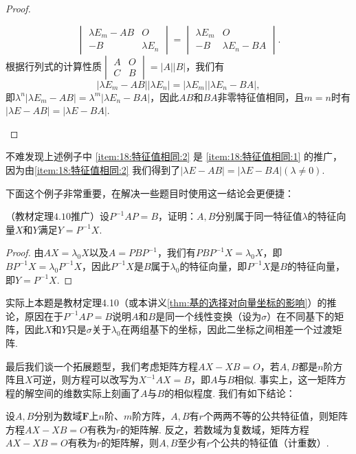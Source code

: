 \begin{proof}
\begin{enumerate}
\[\begin{vmatrix}
                      \lambda E_m-AB & O \\ -B & \lambda E_n
                  \end{vmatrix}=\begin{vmatrix}
                      \lambda E_m & O \\ -B & \lambda E_n-BA
                  \end{vmatrix}.\]
              根据行列式的计算性质$\begin{vmatrix}
                      A & O \\ C & B
                  \end{vmatrix}=|A||B|$，我们有
              \[|\lambda E_m-AB||\lambda E_n|=|\lambda E_m||\lambda E_n-BA|,\]
              即$\lambda^n|\lambda E_m-AB|=\lambda^m|\lambda E_n-BA|$，因此$AB$和$BA$非零特征值相同，且$m=n$时有$|\lambda E-AB|=|\lambda E-BA|$.
    \end{enumerate}
\end{proof}

不难发现上述例子中 \ref*{item:18:特征值相同:2} 是 \ref*{item:18:特征值相同:1} 的推广，因为由\ref*{item:18:特征值相同:2} 我们得到了$|\lambda E-AB|=|\lambda E-BA|(\lambda\neq 0)$.

下面这个例子非常重要，在解决一些题目时使用这一结论会更便捷：
\begin{example}{}{}
    （教材定理$4.10$推广）设$P^{-1}AP=B$，证明：$A,B$分别属于同一特征值$\lambda$的特征向量$X$和$Y$满足$Y=P^{-1}X$.
\end{example}

\begin{proof}
    由$AX=\lambda_0 X$以及$A=PBP^{-1}$，我们有$PBP^{-1}X=\lambda_0 X$，即$BP^{-1}X=\lambda_0 P^{-1}X$，因此$P^{-1}X$是$B$属于$\lambda_0$的特征向量，即$P^{-1}X$是$B$的特征向量，即$Y=P^{-1}X$.
\end{proof}

实际上本题是教材定理4.10（或本讲义\autoref{thm:基的选择对向量坐标的影响}）的推论，原因在于$P^{-1}AP=B$说明$A$和$B$是同一个线性变换（设为$\sigma$）在不同基下的矩阵，因此$X$和$Y$只是$\sigma$关于$\lambda_0$在两组基下的坐标，因此二坐标之间相差一个过渡矩阵.

最后我们谈一个拓展题型，我们考虑矩阵方程$AX-XB=O$，若$A,B$都是$n$阶方阵且$X$可逆，则方程可以改写为$X^{-1}AX=B$，即$A$与$B$相似. 事实上，这一矩阵方程的解空间的维数实际上刻画了$A$与$B$的相似程度. 我们有如下结论：
\begin{theorem}{}{}
    设$A,B$分别为数域$\mathbf{F}$上$n$阶、$m$阶方阵，$A,B$有$r$个两两不等的公共特征值，则矩阵方程$AX-XB=O$有秩为$r$的矩阵解. 反之，若数域为复数域，矩阵方程$AX-XB=O$有秩为$r$的矩阵解，则$A,B$至少有$r$个公共的特征值（计重数）.
\end{theorem}

